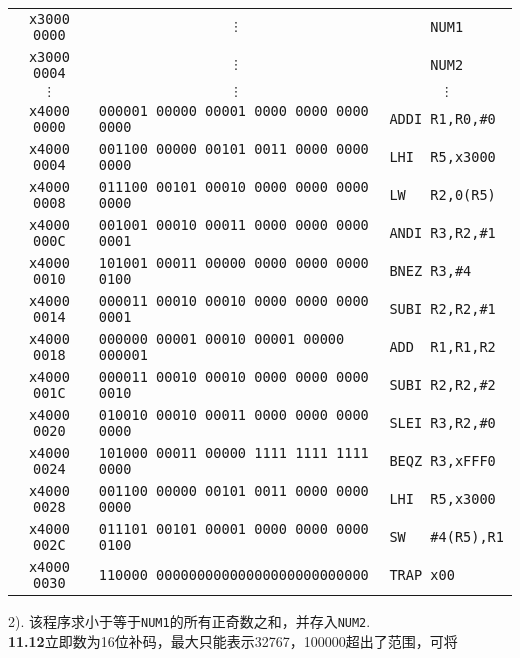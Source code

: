 \documentclass[UTF8]{ctexart}
\begin{document}
\begin{center}
	\begin{tabular}{cll}
		\toprule
		\texttt{x3000 0000}          & \multicolumn{1}{c}{$\vdots$}                    & \multicolumn{1}{c}{\texttt{NUM1}} \\
		\texttt{x3000 0004}          & \multicolumn{1}{c}{$\vdots$}                    & \multicolumn{1}{c}{\texttt{NUM2}} \\
		\multicolumn{1}{c}{$\vdots$} & \multicolumn{1}{c}{$\vdots$}                    & \multicolumn{1}{c}{$\vdots$}      \\
		\texttt{x4000 0000}          & \texttt{000001 00000 00001 0000 0000 0000 0000} & \texttt{ADDI R1,R0,\#0}           \\
		\texttt{x4000 0004}          & \texttt{001100 00000 00101 0011 0000 0000 0000} & \texttt{LHI\ \ R5,x3000}          \\
		\texttt{x4000 0008}          & \texttt{011100 00101 00010 0000 0000 0000 0000} & \texttt{LW\ \ \ R2,0(R5)}         \\
		\texttt{x4000 000C}          & \texttt{001001 00010 00011 0000 0000 0000 0001} & \texttt{ANDI R3,R2,\#1}           \\
		\texttt{x4000 0010}          & \texttt{101001 00011 00000 0000 0000 0000 0100} & \texttt{BNEZ R3,\#4}              \\
		\texttt{x4000 0014}          & \texttt{000011 00010 00010 0000 0000 0000 0001} & \texttt{SUBI R2,R2,\#1}           \\
		\texttt{x4000 0018}          & \texttt{000000 00001 00010 00001 00000 000001}  & \texttt{ADD\ \ R1,R1,R2}           \\
		\texttt{x4000 001C}          & \texttt{000011 00010 00010 0000 0000 0000 0010} & \texttt{SUBI R2,R2,\#2}           \\
		\texttt{x4000 0020}          & \texttt{010010 00010 00011 0000 0000 0000 0000} & \texttt{SLEI R3,R2,\#0}           \\
		\texttt{x4000 0024}          & \texttt{101000 00011 00000 1111 1111 1111 0000} & \texttt{BEQZ R3,xFFF0}            \\
		\texttt{x4000 0028}          & \texttt{001100 00000 00101 0011 0000 0000 0000} & \texttt{LHI\ \ R5,x3000}          \\
		\texttt{x4000 002C}          & \texttt{011101 00101 00001 0000 0000 0000 0100} & \texttt{SW\ \ \ \#4(R5),R1}       \\
		\texttt{x4000 0030}          & \texttt{110000 00000000000000000000000000}      & \texttt{TRAP x00}                 \\
		\bottomrule
	\end{tabular}
\end{center}
2). 该程序求小于等于\texttt{NUM1}的所有正奇数之和，并存入\texttt{NUM2}.\\
\noindent\textbf{11.12}\quad 立即数为16位补码，最大只能表示32767，100000超出了范围，可将
\end{document}
